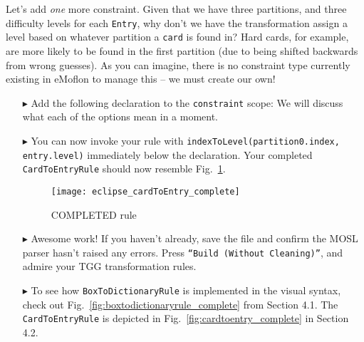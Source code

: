 \newpage

Let's add \emph{one} more constraint. Given that we have three partitions, and three difficulty levels for each \texttt{Entry}, why don't we have the
transformation assign a level based on whatever partition a \texttt{card} is found in? Hard cards, for example, are more likely to be found in the first
partition (due to being shifted backwards from wrong guesses).  As you can imagine, there is no constraint type currently existing in eMoflon to manage this --
we must create our own!

\begin{itemize}

\item[$\blacktriangleright$] Add the following declaration to the \texttt{constraint} scope:  We will discuss what
each of the options mean in a moment.

\vspace{0.5cm}

\item[$\blacktriangleright$] You can now invoke your rule with \texttt{indexToLevel(partition0.index, entry.level)} immediately below the declaration. Your
completed \texttt{CardToEntryRule} should now resemble Fig.~\ref{fig:c2eDone}.

\begin{figure}[htbp]
\begin{center}
  \texttt{[image: eclipse\_cardToEntry\_complete]}
  \caption{COMPLETED rule}
  \label{fig:c2eDone}
\end{center}
\end{figure}

\vspace{0.5cm}

\item[$\blacktriangleright$] Awesome work! If you haven't already, save the file and confirm the MOSL parser hasn't raised any errors. Press \texttt{``Build
(Without Cleaning)''}, and admire your TGG transformation rules. 

\vspace{0.5cm}

\item[$\blacktriangleright$] To see how \texttt{BoxToDictionaryRule} is implemented in the visual syntax, check out Fig.~\ref{fig:boxtodictionaryrule_complete}
from Section 4.1. The \texttt{CardToEntryRule} is depicted in Fig.~\ref{fig:cardtoentry_complete} in Section 4.2.

\end{itemize}
